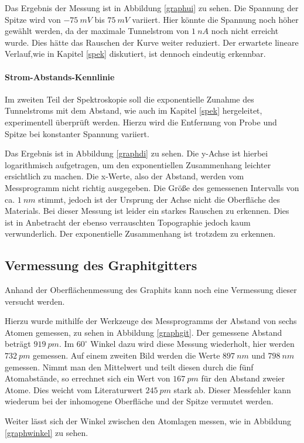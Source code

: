 Das Ergebnis der Messung ist in Abbildung \ref{graphui} zu sehen. Die Spannung der 
Spitze wird von $\SI{-75}{mV}$ bis $\SI{75}{mV}$ variiert. Hier könnte die Spannung
noch höher gewählt werden, da der maximale Tunnelstrom von $\SI{1}{nA}$ noch nicht
erreicht wurde. Dies hätte das Rauschen der Kurve weiter reduziert.
Der erwartete lineare Verlauf,wie in Kapitel \ref{spek} diskutiert,
ist dennoch eindeutig erkennbar.

\paragraph{Strom-Abstands-Kennlinie}
Im zweiten Teil der Spektroskopie soll die exponentielle Zunahme des Tunnelstroms
mit dem Abstand, wie auch im Kapitel \ref{spek} hergeleitet, experimentell 
überprüft werden. Hierzu wird die Entfernung von Probe und Spitze bei konstanter
Spannung variiert. 

Das Ergebnis ist in Abbildung \ref{graphdi} zu sehen. Die y-Achse ist hierbei
logarithmisch aufgetragen, um den exponentiellen Zusammenhang leichter ersichtlich
zu machen. Die x-Werte, also der Abstand, werden vom Messprogramm nicht richtig
ausgegeben. Die Größe des gemessenen Intervalls von ca. $\SI{1}{nm}$ stimmt, 
jedoch ist der Ursprung der Achse nicht die Oberfläche des Materials.
Bei dieser Messung ist leider ein starkes Rauschen zu erkennen. Dies ist in 
Anbetracht der ebenso verrauschten Topographie jedoch kaum verwunderlich.
Der exponentielle Zusammenhang ist trotzdem zu erkennen.

\subsection{Vermessung des Graphitgitters}
Anhand der Oberflächenmessung des Graphits kann noch eine Vermessung dieser
versucht werden.

Hierzu wurde mithilfe der Werkzeuge des Messprogramms der Abstand von sechs
Atomen gemessen, zu sehen in Abbildung \ref{graphgit}. Der gemessene Abstand
beträgt $\SI{919}{pm}$. Im $60^\circ$ Winkel dazu wird diese Messung wiederholt,
hier werden $\SI{732}{pm}$ gemessen. Auf einem zweiten Bild werden die Werte
$\SI{897}{nm}$ und $\SI{798}{nm}$ gemessen. Nimmt man den Mittelwert und teilt
diesen durch die fünf Atomabstände, so errechnet sich ein Wert von $\SI{167}{pm}$
für den Abstand zweier Atome.
Dies weicht vom Literaturwert $\SI{245}{pm}$ stark ab. Dieser Messfehler kann 
wiederum bei der inhomogene Oberfläche und der Spitze vermutet werden.\par
Weiter lässt sich der Winkel zwischen den Atomlagen messen, wie in Abbildung
\ref{graphwinkel} zu sehen. 

